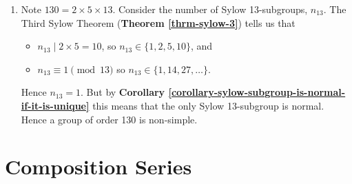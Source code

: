 \begin{enumerate}
    \item Note $130 = 2 \times 5 \times 13$. Consider the number of Sylow 13-subgroups, $n_{13}$. The Third Sylow Theorem (\textbf{Theorem \ref{thrm-sylow-3}}) tells us that
    \begin{itemize}
        \item $n_13 \mid 2 \times 5 = 10$, so $n_13 \in \{1, 2, 5, 10\}$, and
        \item $n_13 \equiv 1 \pmod{13}$ so $n_13 \in \{1, 14, 27, \dots\}$.
    \end{itemize}
    Hence $n_13 = 1$. But by \textbf{Corollary \ref{corollary-sylow-subgroup-is-normal-if-it-is-unique}} this means that the only Sylow 13-subgroup is normal. Hence a group of order 130 is non-simple.
\end{enumerate}

\section{Composition Series}
